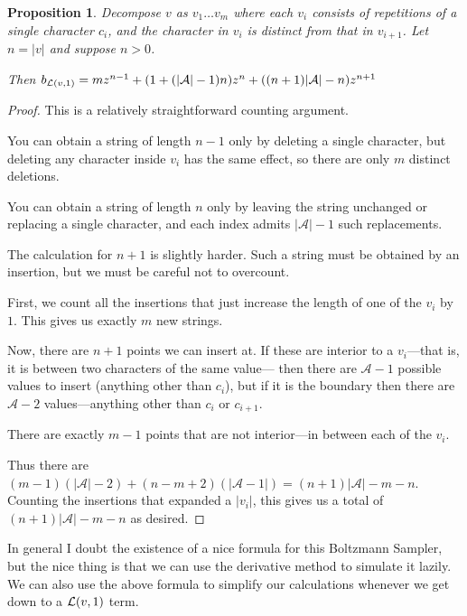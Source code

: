 \documentclass[a4paper]{book}
\newtheorem{proposition}{Proposition}
\begin{document}
\begin{proposition}
Decompose \(v\) as \(v_1 \ldots v_m\) where each \(v_i\) consists of repetitions of a single character \(c_i\),
and the character in \(v_i\) is distinct from that in \(v_{i + 1}\).
Let \(n = |v|\) and suppose \(n > 0\).

Then \(b_{\mathcal{L} (v, 1)} = m z^{n - 1} + (1 + (|\mathcal{A}| - 1)n) z^{n} + ((n + 1) |\mathcal{A}| - n) z^{n + 1}\)
\end{proposition}

\begin{proof}
This is a relatively straightforward counting argument.

You can obtain a string of length \(n - 1\) only by deleting a single character,
but deleting any character inside \(v_i\) has the same effect,
so there are only \(m\) distinct deletions.

You can obtain a string of length \(n\) only by leaving the string unchanged or replacing a single character,
and each index admits \(|\mathcal{A}| - 1\) such replacements.

The calculation for \(n + 1\) is slightly harder.
Such a string must be obtained by an insertion,
but we must be careful not to overcount.

First,
we count all the insertions that just increase the length of one of the \(v_i\) by \(1\).
This gives us exactly \(m\) new strings.

Now, there are \(n + 1\) points we can insert at.
If these are interior to a \(v_i\)---that is,
it is between two characters of the same value---
then there are \(\mathcal{A} - 1\) possible values to insert (anything other than \(c_i\)),
but if it is the boundary then there are  \(\mathcal{A} - 2\) values---anything
other than \(c_i\) or \(c_{i + 1}\).

There are exactly \(m - 1\) points that are not interior---in
between each of the \(v_i\).

Thus there are \((m - 1)(|\mathcal{A}| - 2) + (n - m + 2)(|\mathcal{A} - 1|) = (n + 1) |\mathcal{A}| - m - n\).
Counting the insertions that expanded a \(|v_i|\),
this gives us a total of \((n + 1) |\mathcal{A}| - m - n\) as desired.
\end{proof}

In general I doubt the existence of a nice formula for this Boltzmann Sampler,
but the nice thing is that we can use the derivative method to simulate it lazily.
We can also use the above formula to simplify our calculations whenever we get down to a \(\mathcal{L} (v, 1)\) term.
\end{document}
